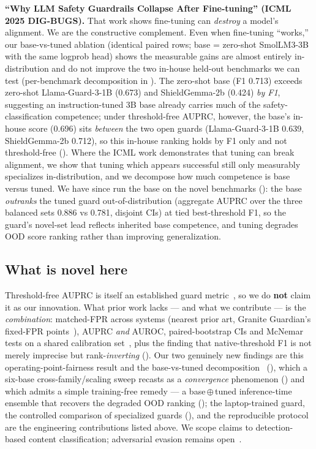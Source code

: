 \documentclass[sigconf,nonacm]{acmart}
\begin{document}
\textbf{``Why LLM Safety Guardrails Collapse After Fine-tuning'' \cite{hsiung2025guardrails} (ICML 2025 DIG-BUGS).} That work shows fine-tuning can \emph{destroy} a model's alignment. We are the constructive complement. Even when fine-tuning ``works,'' our base-vs-tuned ablation (identical paired rows; base = zero-shot SmolLM3-3B with the same logprob head) shows the measurable gains are almost entirely in-distribution and do not improve the two in-house held-out benchmarks we can test (per-benchmark decomposition in ). The zero-shot base (F1 0.713) exceeds zero-shot Llama-Guard-3-1B (0.673) and ShieldGemma-2b (0.424) \emph{by F1}, suggesting an instruction-tuned 3B base already carries much of the safety-classification competence; under threshold-free AUPRC, however, the base's in-house score (0.696) sits \emph{between} the two open guards (Llama-Guard-3-1B 0.639, ShieldGemma-2b 0.712), so this in-house ranking holds by F1 only and not threshold-free (). Where the ICML work demonstrates that tuning can break alignment, we show that tuning which appears successful still only measurably specializes in-distribution, and we decompose how much competence is base versus tuned. We have since run the base on the novel benchmarks (): the base \emph{outranks} the tuned guard out-of-distribution (aggregate AUPRC over the three balanced sets 0.886 vs 0.781, disjoint CIs) at tied best-threshold F1, so the guard's novel-set lead reflects inherited base competence, and tuning degrades OOD score ranking rather than improving generalization.

\subsection{What is novel here}

Threshold-free AUPRC is itself an established guard metric~\cite{markov2023holistic,inan2023llamaguard,zeng2024shieldgemma,padhi2024graniteguardian,kang2025r2guard}, so we do \textbf{not} claim it as our innovation. What prior work lacks --- and what we contribute --- is the \emph{combination}: matched-FPR across systems (nearest prior art, Granite Guardian's fixed-FPR points~\cite{padhi2024graniteguardian}), AUPRC \emph{and} AUROC, paired-bootstrap CIs and McNemar tests on a shared calibration set~\cite{guo2017calibration}, plus the finding that native-threshold F1 is not merely imprecise but rank-\emph{inverting} (). Our two genuinely new findings are this operating-point-fairness result and the base-vs-tuned decomposition~\cite{hsiung2025guardrails} (), which a six-base cross-family/scaling sweep recasts as a \emph{convergence} phenomenon () and which admits a simple training-free remedy --- a base\,$\oplus$\,tuned inference-time ensemble that recovers the degraded OOD ranking (); the laptop-trained guard, the controlled comparison of specialized guards (), and the reproducible protocol are the engineering contributions listed above. We scope claims to detection-based content classification; adversarial evasion remains open~\cite{hackett2025bypassing}.
\end{document}
